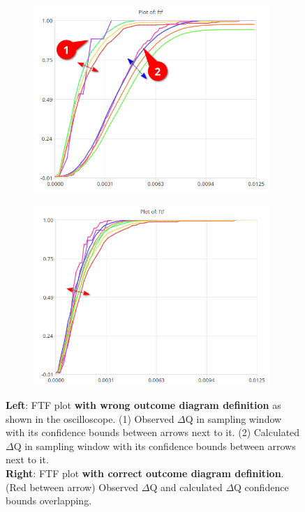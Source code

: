         \begin{figure}[H]
                \centering
                \begin{subfigure}{.5\textwidth}
                    \centering
                    \includegraphics[width =0.98\textwidth]{img/bad1.png}
                    \label{fig:bad}
                \end{subfigure}%
                \begin{subfigure}{.5\textwidth}%
                    \centering%
                    \includegraphics[width =0.98\textwidth]{img/gooda.png}%
                    \label{fig:good}%
                \end{subfigure}%
                \caption{\textbf{Left}: FTF plot \textbf{with wrong outcome diagram definition} as shown in the oscilloscope. (1) Observed $\Delta$Q in sampling window with its confidence bounds between arrows next to it. (2) Calculated $\Delta$Q in sampling window with its confidence bounds between arrows next to it. \\
                \textbf{Right}: FTF plot \textbf{with correct outcome diagram definition}. (Red between arrow) Observed $\Delta$Q and calculated $\Delta$Q confidence bounds overlapping.}
                \label{fig:ftf_osc}%
            \end{figure}%

